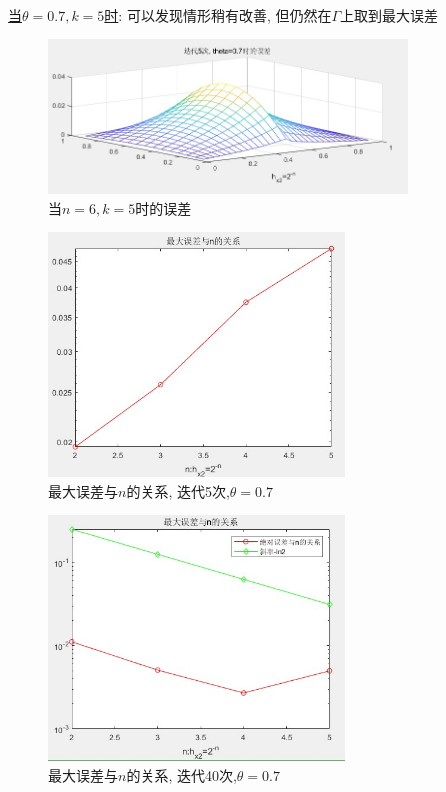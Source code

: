 \documentclass[12pt]{article}
\begin{document}
\quad \\
\noindent \underline{当$\theta=0.7,k=5$时}: 可以发现情形稍有改善, 但仍然在$\Gamma$上取到最大误差
\begin{figure}[H]
	\centering
	\includegraphics[width=0.85\textwidth]{8}
	\caption{当$n=6,k=5$时的误差}
\end{figure}
\begin{figure}[H]
	\centering
	\includegraphics[width=0.7\textwidth]{9}
	\caption{最大误差与$n$的关系, 迭代5次,$\theta=0.7$}
\end{figure}
\begin{figure}[H]
	\centering
	\includegraphics[width=0.7\textwidth]{10}
	\caption{最大误差与$n$的关系, 迭代40次,$\theta=0.7$}
\end{figure}
\end{document}
